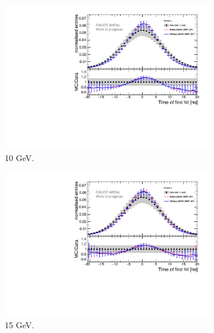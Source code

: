 \begin{figure}[t]
	\begin{subfigure}[t]{0.45\textwidth}
		\centering
		\includegraphics[width=1\textwidth]{chap5/fig_AHCAL_timing/Electrons/Comparison_SimData_Electrons10GeV.pdf}
		\caption{10 GeV.}\label{fig:elec_sim_data_10GeV}
	\end{subfigure}
	\hfill
	\begin{subfigure}[t]{0.45\textwidth}
		\centering
		\includegraphics[width=1\textwidth]{chap5/fig_AHCAL_timing/Electrons/Comparison_SimData_Electrons15GeV.pdf}
		\caption{15 GeV.}\label{fig:elec_sim_data_15GeV}
	\end{subfigure}
	\hfill
	\begin{subfigure}[t]{0.45\textwidth}
		\centering

\end{subfigure}
\end{figure}
